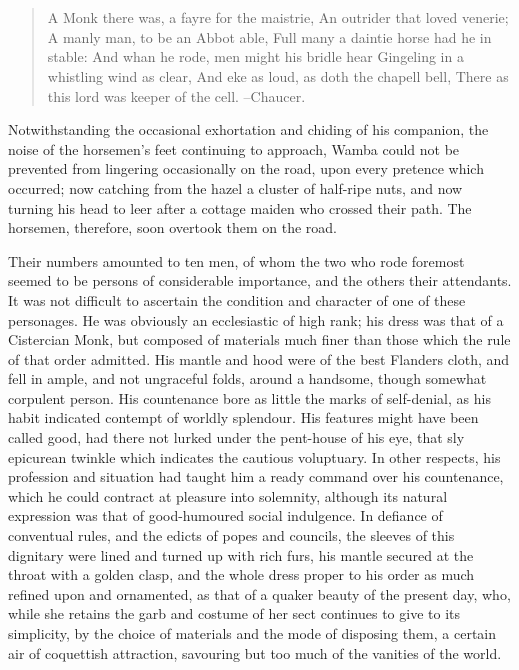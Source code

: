 \chapter{}

\begin{quote}
A Monk there was, a fayre for the maistrie,
An outrider that loved venerie;
A manly man, to be an Abbot able,
Full many a daintie horse had he in stable:
And whan he rode, men might his bridle hear
Gingeling in a whistling wind as clear,
And eke as loud, as doth the chapell bell,
There as this lord was keeper of the cell.
--Chaucer.
\end{quote}

Notwithstanding the occasional exhortation and chiding of his companion,
the noise of the horsemen's feet continuing to approach, Wamba could not
be prevented from lingering occasionally on the road, upon every
pretence which occurred; now catching from the hazel a cluster of
half-ripe nuts, and now turning his head to leer after a cottage maiden
who crossed their path. The horsemen, therefore, soon overtook them on
the road.

Their numbers amounted to ten men, of whom the two who rode foremost
seemed to be persons of considerable importance, and the others their
attendants. It was not difficult to ascertain the condition and
character of one of these personages. He was obviously an ecclesiastic
of high rank; his dress was that of a Cistercian Monk, but composed of
materials much finer than those which the rule of that order admitted.
His mantle and hood were of the best Flanders cloth, and fell in ample,
and not ungraceful folds, around a handsome, though somewhat corpulent
person. His countenance bore as little the marks of self-denial, as his
habit indicated contempt of worldly splendour. His features might have
been called good, had there not lurked under the pent-house of his eye,
that sly epicurean twinkle which indicates the cautious voluptuary. In
other respects, his profession and situation had taught him a ready
command over his countenance, which he could contract at pleasure into
solemnity, although its natural expression was that of good-humoured
social indulgence. In defiance of conventual rules, and the edicts of
popes and councils, the sleeves of this dignitary were lined and turned
up with rich furs, his mantle secured at the throat with a golden clasp,
and the whole dress proper to his order as much refined upon and
ornamented, as that of a quaker beauty of the present day, who, while
she retains the garb and costume of her sect continues to give to its
simplicity, by the choice of materials and the mode of disposing them, a
certain air of coquettish attraction, savouring but too much of the
vanities of the world.

